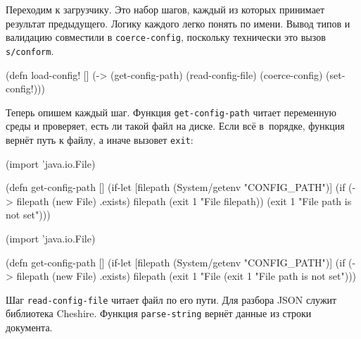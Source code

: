 \fi

Переходим к загрузчику. Это набор шагов, каждый из которых принимает результат
предыдущего. Логику каждого легко понять по имени. Вывод типов и валидацию
совместили в \verb|coerce-config|, поскольку технически это вызов
\verb|s/conform|.


\begin{english}
  \begin{clojure}
(defn load-config! []
  (-> (get-config-path)
      (read-config-file)
      (coerce-config)
      (set-config!)))
  \end{clojure}
\end{english}

Теперь опишем каждый шаг. Функция \verb|get-config-path| читает переменную
среды и проверяет, есть ли такой файл на диске. Если всё в~порядке, функция
вернёт путь к файлу, а иначе вызовет \verb|exit|:


\ifx\devicetype\mobile

\begin{english}
  \begin{clojure}
(import 'java.io.File)

(defn get-config-path []
  (if-let [filepath (System/getenv
                      "CONFIG_PATH")]
    (if (-> filepath (new File) .exists)
      filepath
      (exit 1 "File %
        filepath))
    (exit 1 "File path is not set")))
  \end{clojure}
\end{english}

\else

\begin{english}
  \begin{clojure}
(import 'java.io.File)

(defn get-config-path []
  (if-let [filepath (System/getenv "CONFIG_PATH")]
    (if (-> filepath (new File) .exists)
      filepath
      (exit 1 "File %
    (exit 1 "File path is not set")))
  \end{clojure}
\end{english}

\fi

Шаг \verb|read-config-file| читает файл по его пути. Для разбора JSON служит
библиотека Cheshire. Функция \verb|parse-string| вернёт данные из
строки документа.


